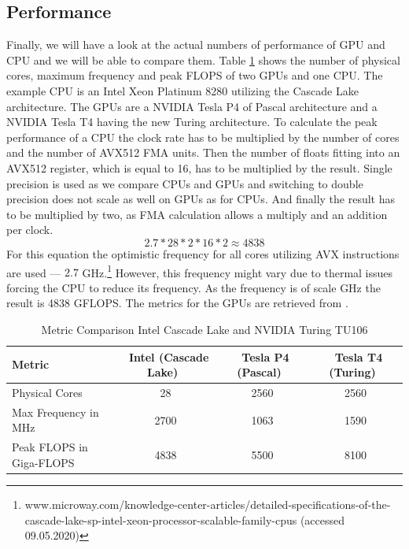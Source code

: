 \documentclass[a4paper,12pt]{llncs}
\numberwithin{equation}{section}
\begin{document}
\subsection{Performance}
  Finally, we will have a look at the actual numbers of performance of GPU and CPU and we will be able to compare them.
  Table \ref{tab:comp} shows the number of physical cores, maximum frequency and peak FLOPS of two GPUs and one CPU.
  The example CPU is an Intel Xeon Platinum 8280 utilizing the Cascade Lake architecture.
  The GPUs are a NVIDIA Tesla P4 of Pascal architecture and a NVIDIA Tesla T4 having the new Turing architecture.
  To calculate the peak performance of a CPU the clock rate has to be multiplied by the number of cores and the number of AVX512 FMA units.
  Then the number of floats fitting into an AVX512 register, which is equal to 16, has to be multiplied by the result.
  Single precision is used as we compare CPUs and GPUs and switching to double precision does not scale as well on GPUs as for CPUs.
  And finally the result has to be multiplied by two, as FMA calculation allows a multiply and an addition per clock.
  \[2.7 * 28 * 2 * 16 * 2 \approx 4838\]
  For this equation the optimistic frequency for all cores utilizing AVX instructions are used --- \(2.7\) GHz.\footnote{www.microway.com/knowledge-center-articles/detailed-specifications-of-the-cascade-lake-sp-intel-xeon-processor-scalable-family-cpus (accessed 09.05.2020)}
  However, this frequency might vary due to thermal issues forcing the CPU to reduce its frequency.
  As the frequency is of scale GHz the result is 4838 GFLOPS.
  The metrics for the GPUs are retrieved from \cite{NVIDIA.2018}.
  
\begin{table}[htbp]
  \centering
  \caption{Metric Comparison Intel Cascade Lake and NVIDIA Turing TU106}
  \label{tab:comp}
  \begin{tabular}{|l|c|c|c|}
    \hline
	\textbf{Metric} & \textbf{~Intel (Cascade Lake)~} & \textbf{~Tesla P4 (Pascal)~} & \textbf{~Tesla T4 (Turing)~} \\\hline
	Physical Cores & 28 & 2560 & 2560 \\\hline
	Max Frequency in MHz & 2700 & 1063 & 1590 \\\hline
	Peak FLOPS in Giga-FLOPS & 4838 & 5500 & 8100 \\\hline
  \end{tabular}
\end{table}


\end{document}
